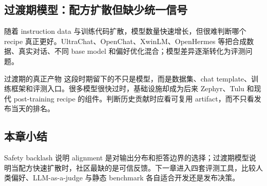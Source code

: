 
\subsection{过渡期模型：配方扩散但缺少统一信号}

随着 instruction data 与训练代码扩散，模型数量快速增长，但很难判断哪个 recipe 真正更好。UltraChat、OpenChat、XwinLM、OpenHermes 等把合成数据、真实对话、不同 base model 和偏好优化混合；模型差异逐渐转化为评测问题。


\begin{knowledgebox}{过渡期的真正产物}
这段时期留下的不只是模型，而是数据集、chat template、训练框架和评测入口。很多模型很快过时，基础设施却成为后来 Zephyr、Tulu 和现代 post-training recipe 的组件。判断历史贡献时应看可复用 artifact，而不只看发布当天的排名。
\end{knowledgebox}

\subsection{本章小结}

Safety backlash 说明 alignment 是对输出分布和拒答边界的选择；过渡期模型说明当配方快速扩散时，社区最缺的是可信反馈。下一章进入四套评测工具，比较人类偏好、LLM-as-a-judge 与静态 benchmark 各自适合开发还是发布决策。

